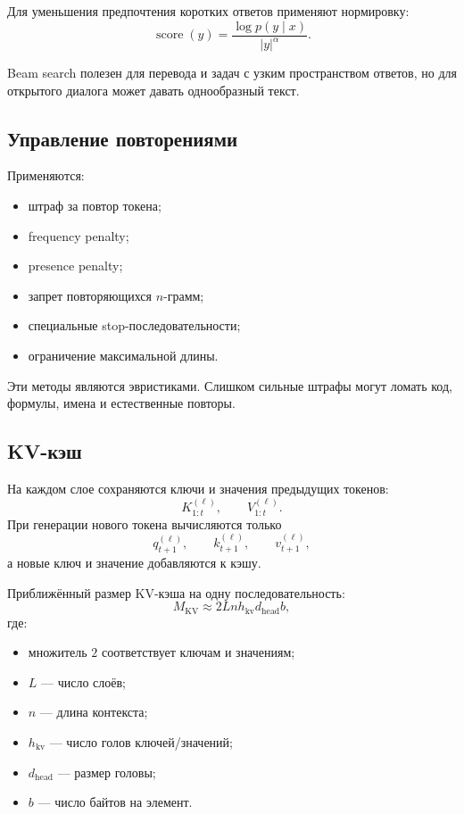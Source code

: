 \documentclass[12pt,a4paper]{article}
\newcommand{\1}{\mathbf{1}}
\theoremstyle{definition}
\theoremstyle{remark}
\begin{document}
Для уменьшения предпочтения коротких ответов применяют нормировку:
\[
\operatorname{score}(y)
=
\frac{\log p(y\mid x)}
{|y|^\alpha}.
\]

Beam search полезен для перевода и задач с узким пространством ответов,
но для открытого диалога может давать однообразный текст.

\subsection{Управление повторениями}

Применяются:

\begin{itemize}
    \item штраф за повтор токена;
    \item frequency penalty;
    \item presence penalty;
    \item запрет повторяющихся $n$-грамм;
    \item специальные stop-последовательности;
    \item ограничение максимальной длины.
\end{itemize}

Эти методы являются эвристиками. Слишком сильные штрафы могут ломать
код, формулы, имена и естественные повторы.

\subsection{KV-кэш}

На каждом слое сохраняются ключи и значения предыдущих токенов:
\[
K_{1:t}^{(\ell)},\qquad
V_{1:t}^{(\ell)}.
\]
При генерации нового токена вычисляются только
\[
q_{t+1}^{(\ell)},\qquad
k_{t+1}^{(\ell)},\qquad
v_{t+1}^{(\ell)},
\]
а новые ключ и значение добавляются к кэшу.

Приближённый размер KV-кэша на одну последовательность:
\[
M_{\mathrm{KV}}
\approx
2Lnh_{\mathrm{kv}}d_{\mathrm{head}}b,
\]
где:

\begin{itemize}
    \item множитель $2$ соответствует ключам и значениям;
    \item $L$ --- число слоёв;
    \item $n$ --- длина контекста;
    \item $h_{\mathrm{kv}}$ --- число голов ключей/значений;
    \item $d_{\mathrm{head}}$ --- размер головы;
    \item $b$ --- число байтов на элемент.
\end{itemize}
\end{document}
